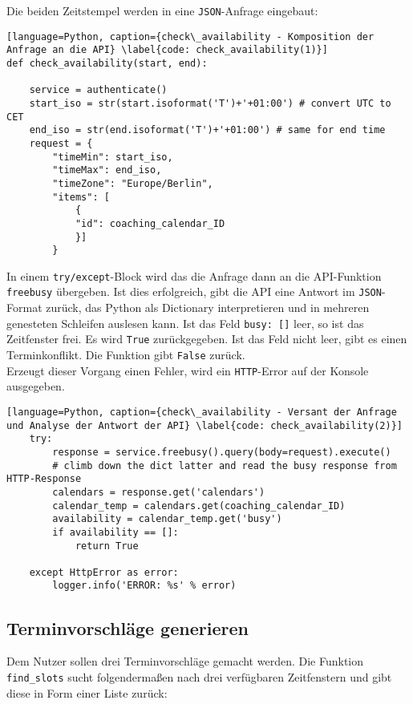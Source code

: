             Die beiden Zeitstempel werden in eine \verb|JSON|-Anfrage eingebaut:
            \begin{lstlisting}[language=Python, caption={check\_availability - Komposition der Anfrage an die API} \label{code: check_availability(1)}]
def check_availability(start, end):

    service = authenticate()
    start_iso = str(start.isoformat('T')+'+01:00') # convert UTC to CET
    end_iso = str(end.isoformat('T')+'+01:00') # same for end time
    request = {
        "timeMin": start_iso,
        "timeMax": end_iso,
        "timeZone": "Europe/Berlin", 
        "items": [
            {
            "id": coaching_calendar_ID
            }]
        }
            \end{lstlisting}

            In einem \verb|try/except|-Block wird das die Anfrage dann an die API-Funktion \verb|freebusy| übergeben. Ist dies erfolgreich, gibt die API eine Antwort im \verb|JSON|-Format zurück, das Python als Dictionary interpretieren und in mehreren genesteten Schleifen auslesen kann. Ist das Feld \verb|busy: []| leer, so ist das Zeitfenster frei. Es wird \verb|True| zurückgegeben. Ist das Feld nicht leer, gibt es einen Terminkonflikt. Die Funktion gibt \verb|False| zurück. \\
            Erzeugt dieser Vorgang einen Fehler, wird ein \verb|HTTP|-Error auf der Konsole ausgegeben. \\

            \begin{lstlisting}[language=Python, caption={check\_availability - Versant der Anfrage und Analyse der Antwort der API} \label{code: check_availability(2)}]
    try:
        response = service.freebusy().query(body=request).execute()    
        # climb down the dict latter and read the busy response from HTTP-Response
        calendars = response.get('calendars')
        calendar_temp = calendars.get(coaching_calendar_ID)
        availability = calendar_temp.get('busy')
        if availability == []:
            return True

    except HttpError as error:
        logger.info('ERROR: %s' % error)
                    \end{lstlisting}




        \subsection{Terminvorschläge generieren}
            Dem Nutzer sollen drei Terminvorschläge gemacht werden. Die Funktion \verb|find_slots| sucht folgendermaßen nach drei verfügbaren Zeitfenstern und gibt diese in Form einer Liste zurück: 
            
